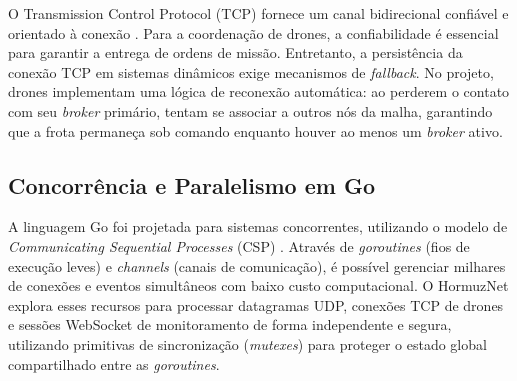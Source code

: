 O Transmission Control Protocol (TCP) fornece um canal bidirecional confiável e orientado à conexão \cite{rfc793}. Para a coordenação de drones, a confiabilidade é essencial para garantir a entrega de ordens de missão. Entretanto, a persistência da conexão TCP em sistemas dinâmicos exige mecanismos de \textit{fallback}. No projeto, drones implementam uma lógica de reconexão automática: ao perderem o contato com seu \textit{broker} primário, tentam se associar a outros nós da malha, garantindo que a frota permaneça sob comando enquanto houver ao menos um \textit{broker} ativo.

\subsection{Concorrência e Paralelismo em Go}

A linguagem Go foi projetada para sistemas concorrentes, utilizando o modelo de \textit{Communicating Sequential Processes} (CSP) \cite{donovan2015go}. Através de \textit{goroutines} (fios de execução leves) e \textit{channels} (canais de comunicação), é possível gerenciar milhares de conexões e eventos simultâneos com baixo custo computacional. O HormuzNet explora esses recursos para processar datagramas UDP, conexões TCP de drones e sessões WebSocket de monitoramento de forma independente e segura, utilizando primitivas de sincronização (\textit{mutexes}) para proteger o estado global compartilhado entre as \textit{goroutines}.
